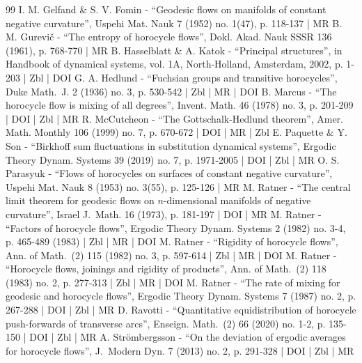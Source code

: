 \begin{thebibliography}{99}
I. M. Gelfand \& S. V. Fomin - “Geodesic flows on manifolds of constant negative curvature”, Uspehi Mat. Nauk 7 (1952) no. 1(47), p. 118-137 | MR
B. M. Gurevič - “The entropy of horocycle flows”, Dokl. Akad. Nauk SSSR 136 (1961), p. 768-770 | MR
B. Hasselblatt \& A. Katok - “Principal structures”, in Handbook of dynamical systems, vol. 1A, North-Holland, Amsterdam, 2002, p. 1-203 | Zbl | DOI
G. A. Hedlund - “Fuchsian groups and transitive horocycles”, Duke Math. J. 2 (1936) no. 3, p. 530-542 | Zbl | MR | DOI
B. Marcus - “The horocycle flow is mixing of all degrees”, Invent. Math. 46 (1978) no. 3, p. 201-209 | DOI | Zbl | MR
R. McCutcheon - “The Gottschalk-Hedlund theorem”, Amer. Math. Monthly 106 (1999) no. 7, p. 670-672 | DOI | MR | Zbl
E. Paquette \& Y. Son - “Birkhoff sum fluctuations in substitution dynamical systems”, Ergodic Theory Dynam. Systems 39 (2019) no. 7, p. 1971-2005 | DOI | Zbl | MR
O. S. Parasyuk - “Flows of horocycles on surfaces of constant negative curvature”, Uspehi Mat. Nauk 8 (1953) no. 3(55), p. 125-126 | MR
M. Ratner - “The central limit theorem for geodesic flows on $n$-dimensional manifolds of negative curvature”, Israel J. Math. 16 (1973), p. 181-197 | DOI | MR
M. Ratner - “Factors of horocycle flows”, Ergodic Theory Dynam. Systems 2 (1982) no. 3-4, p. 465-489 (1983) | Zbl | MR | DOI
M. Ratner - “Rigidity of horocycle flows”, Ann. of Math. (2) 115 (1982) no. 3, p. 597-614 | Zbl | MR | DOI
M. Ratner - “Horocycle flows, joinings and rigidity of products”, Ann. of Math. (2) 118 (1983) no. 2, p. 277-313 | Zbl | MR | DOI
M. Ratner - “The rate of mixing for geodesic and horocycle flows”, Ergodic Theory Dynam. Systems 7 (1987) no. 2, p. 267-288 | DOI | Zbl | MR
D. Ravotti - “Quantitative equidistribution of horocycle push-forwards of transverse arcs”, Enseign. Math. (2) 66 (2020) no. 1-2, p. 135-150 | DOI | Zbl | MR
A. Strömbergsson - “On the deviation of ergodic averages for horocycle flows”, J. Modern Dyn. 7 (2013) no. 2, p. 291-328 | DOI | Zbl | MR
\end{thebibliography}
